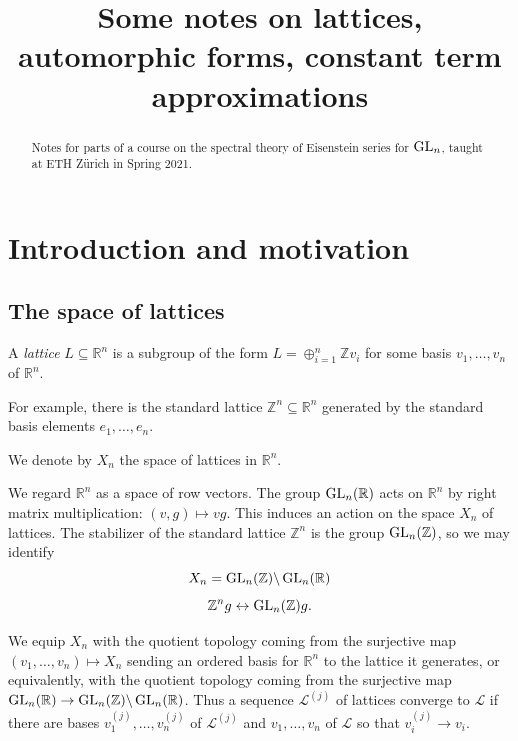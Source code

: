 \documentclass[reqno]{amsart} 
\title{Some notes on lattices, automorphic forms, constant term approximations}
\begin{document}
\maketitle

\begin{abstract}
  Notes for parts of a course on the spectral theory of Eisenstein series for $\operatorname{GL}_n$, taught at ETH Z{\"u}rich in Spring 2021.
\end{abstract}


\setcounter{tocdepth}{1} \tableofcontents

\section{Introduction and motivation}
\label{sec:orga2c9264}

\subsection{The space of lattices}
\label{sec:org93d6839}
\begin{definition}
  A \emph{lattice} $L \subseteq \mathbb{R}^n$ is a subgroup of the form $L = \oplus_{i=1}^n \mathbb{Z} v_i$ for some basis $v_1,\dotsc,v_n$ of $\mathbb{R}^n$.
\end{definition}

For example, there is the standard lattice $\mathbb{Z}^n \subseteq \mathbb{R}^n$ generated by the standard basis elements $e_1,\dotsc,e_n$.

We denote by $X_n$ the space of lattices in $\mathbb{R}^n$.

We regard $\mathbb{R}^n$ as a space of row vectors.  The group $\operatorname{GL}_n(\mathbb{R})$ acts on $\mathbb{R}^n$ by right matrix multiplication: $(v,g) \mapsto v g$.  This induces an action on the space $X_n$ of lattices.  The stabilizer of the standard lattice $\mathbb{Z}^n$ is the group $\operatorname{GL}_n(\mathbb{Z})$, so we may identify
\begin{equation*}
  X_n = \operatorname{GL}_n(\mathbb{Z}) \backslash \operatorname{GL}_n(\mathbb{R})
\end{equation*}
\begin{equation*}
  \mathbb{Z}^n g \leftrightarrow \operatorname{GL}_n(\mathbb{Z}) g.
\end{equation*}

We equip $X_n$ with the quotient topology coming from the surjective map $(v_1,\dotsc,v_n) \mapsto X_n$ sending an ordered basis for $\mathbb{R}^n$ to the lattice it generates, or equivalently, with the quotient topology coming from the surjective map $\operatorname{GL}_n(\mathbb{R}) \rightarrow \operatorname{GL}_n(\mathbb{Z}) \backslash \operatorname{GL}_n(\mathbb{R})$.  Thus a sequence $\mathcal{L}^{(j)}$ of lattices converge to $\mathcal{L}$ if there are bases $v_1^{(j)}, \dotsc, v_n^{(j)}$ of $\mathcal{L}^{(j)}$ and $v_1,\dotsc,v_n$ of $\mathcal{L}$ so that $v_i^{(j)} \rightarrow v_i$.
\end{document}
